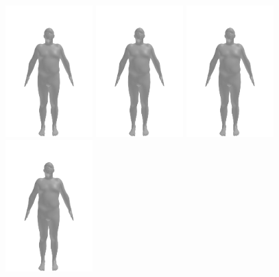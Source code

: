 \begin{figure}[h]
	\centering
	\includegraphics[width=0.3\textwidth]{files/patients/2_predicted_2}
	\includegraphics[width=0.3\textwidth]{files/patients/2_predicted_3}
	\includegraphics[width=0.3\textwidth]{files/patients/2_predicted_3}
	\linebreak
	\includegraphics[width=0.3\textwidth]{files/patients/2_predicted_5}

\end{figure}
